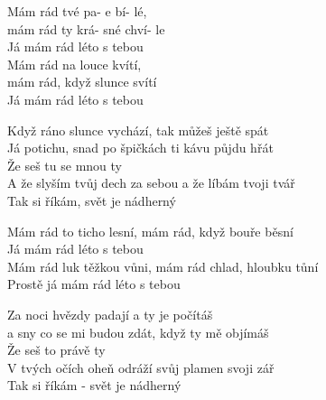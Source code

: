 
\vspace{-2pt}
\ve{}
Mám rád \quad {}tvé pa- \quad {}e bí- \qquad {}lé, \\
mám rád \quad {}ty krá- \quad {}sné chví- \quad {}le\\
Já mám rád léto s tebou\\
Mám rád na louce kvítí,\\
mám rád, když slunce svítí\\
Já mám rád léto s tebou



Když ráno slunce \qquad {}vychází, tak \quad {}můžeš ještě \qquad {}spát\\
Já \qquad {}potichu, snad \quad {}po špičkách ti \qquad {}kávu půjdu \quad {}hřát\\
Že seš tu se mnou ty \\
A že slyším tvůj dech za sebou a že líbám tvoji tvář\\
Tak si říkám, svět je nádherný

\vspace{-5pt}
\ve{}
Mám rád to ticho lesní, mám rád, když bouře běsní\\
Já mám rád léto s tebou\\
Mám rád luk těžkou vůni, mám rád chlad, hloubku tůní\\
Prostě já mám rád léto s tebou 

Za noci hvězdy padají a ty je počítáš\\
a sny co se mi budou zdát, když ty mě objímáš\\
Že seš to právě ty\\
V tvých očích oheň odráží svůj plamen svoji zář\\
Tak si říkám - svět je nádherný
\vspace{-5pt}

